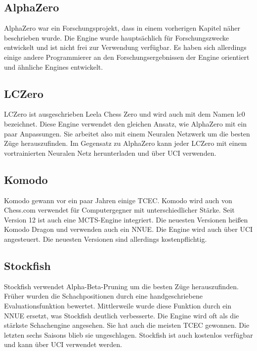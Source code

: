 \subsection{AlphaZero}
AlphaZero war ein Forschungsprojekt, dass in einem vorherigen Kapitel näher beschrieben wurde. Die Engine wurde hauptsächlich für Forschungszwecke entwickelt und ist nicht frei zur Verwendung verfügbar. Es haben sich allerdings einige andere Programmierer an den Forschungsergebnissen der Engine orientiert und ähnliche Engines entwickelt.

\subsection{LCZero}
LCZero ist ausgeschrieben Leela Chess Zero und wird auch mit dem Namen lc0 bezeichnet. Diese Engine verwendet den gleichen Ansatz, wie AlphaZero mit ein paar Anpassungen. Sie arbeitet also mit einem Neuralen Netzwerk um die besten Züge herauszufinden. Im Gegensatz zu AlphaZero kann jeder LCZero mit einem vortrainierten Neuralen Netz herunterladen und über \ac{UCI} verwenden.
\cite{noauthor_neural_2020}

\subsection{Komodo}
Komodo gewann vor ein paar Jahren einige \ac{TCEC}. Komodo wird auch von Chess.com verwendet für Computergegner mit unterschiedlicher Stärke. Seit Version 12 ist auch eine \ac{MCTS}-Engine integriert. Die neuesten Versionen heißen Komodo Dragon und verwenden auch ein \ac{NNUE}. Die Engine wird auch über \ac{UCI} angesteuert. Die neuesten Versionen sind allerdings kostenpflichtig.
\cite{wikpedia_foundation_inc_komodo_2024}

\subsection{Stockfish}
Stockfish verwendet Alpha-Beta-Pruning um die besten Züge herauszufinden. Früher wurden die Schachpositionen durch eine handgeschriebene Evaluationsfunktion bewertet. Mittlerweile wurde diese Funktion durch ein \ac{NNUE} ersetzt, was Stockfish deutlich verbesserte. Die Engine wird oft als die stärkste Schachengine angesehen. Sie hat auch die meisten \ac{TCEC} gewonnen. Die letzten sechs Saisons blieb sie ungeschlagen. Stockfish ist auch kostenlos verfügbar und kann über \ac{UCI} verwendet werden.
\cite{wikpedia_foundation_inc_stockfish_2025}

